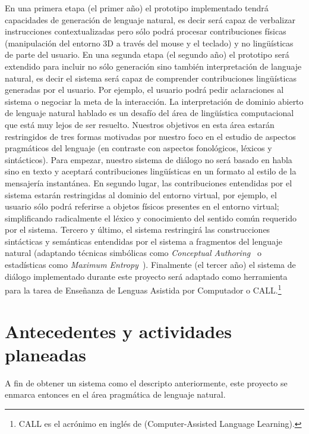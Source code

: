 \documentclass[11pt]{article}
\begin{document}
En una primera etapa (el primer a\~no) el prototipo
implementado tendr\'a capacidades de generaci\'on de lenguaje natural, es decir
ser\'a capaz de verbalizar instrucciones contextualizadas pero s\'olo podr\'a
procesar contribuciones f\'isicas (manipulaci\'on del entorno 3D a trav\'es
del mouse y el teclado) y no ling\"u\'isticas de parte del usuario. En una
segunda etapa (el segundo a\~no) el prototipo ser\'a extendido para incluir no
s\'olo generaci\'on sino tambi\'en interpretaci\'on de languaje natural, es
decir el sistema ser\'a capaz de
comprender contribuciones ling\"u\'isticas generadas por el usuario. Por
ejemplo, el usuario podr\'a pedir aclaraciones al sistema o negociar la meta
de la interacci\'on. La interpretaci\'on de dominio abierto de lenguaje natural
hablado es un desaf\'io del \'area de ling\"u\'istica computacional que est\'a
muy lejos de ser resuelto. Nuestros objetivos en esta \'area estar\'an
restringidos de tres formas motivadas por nuestro foco en el estudio de
aspectos pragm\'aticos del lenguaje (en contraste con aspectos fonol\'ogicos,
l\'exicos y sint\'acticos). Para empezar, nuestro sistema de di\'alogo no
ser\'a basado en habla sino en texto y aceptar\'a contribuciones
ling\"u\'isticas en un formato al estilo de la mensajer\'ia instant\'anea.
En segundo lugar, las contribuciones entendidas por el sistema estar\'an
restringidas al dominio del entorno virtual, por ejemplo, el usuario s\'olo
podr\'a referirse a objetos f\'isicos presentes en el entorno virtual; 
simplificando radicalmente el l\'exico y conocimiento del sentido com\'un
requerido por el sistema. Tercero y \'ultimo, el sistema restringir\'a las
construcciones sint\'acticas y sem\'anticas entendidas por el sistema a
fragmentos del lenguaje natural (adaptando t\'ecnicas simb\'olicas como
\emph{Conceptual Authoring}~\citep{hallett07} o estad\'isticas como
\emph{Maximum Entropy}~\citep{sagae09}). Finalmente (el tercer a\~no) el sistema
de di\'alogo
implementado durante este proyecto ser\'a adaptado como herramienta para la
tarea de Ense\~nanza de Lenguas Asistida por Computador o CALL.\footnote{CALL es
el acr\'onimo en ingl\'es de (Computer-Assisted Language
Learning).}  

\section{Antecedentes y actividades planeadas} \label{antecedentes}

A fin de obtener un sistema como el descripto anteriormente, este proyecto
se enmarca entonces en el \'area pragm\'atica de lenguaje natural.
\end{document}
